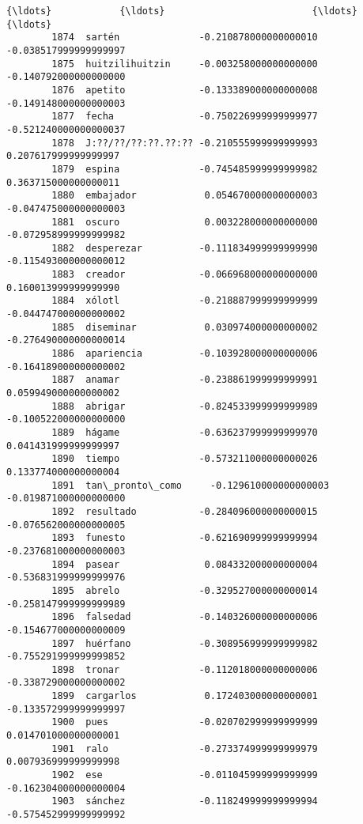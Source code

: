 \documentclass[11pt]{article}
\begin{document}
\begin{Verbatim}[commandchars=\\\{\}]
        {\ldots}            {\ldots}                          {\ldots}                   {\ldots}   
        1874  sartén              -0.210878000000000010 -0.038517999999999997   
        1875  huitzilihuitzin     -0.003258000000000000 -0.140792000000000000   
        1876  apetito             -0.133389000000000008 -0.149148000000000003   
        1877  fecha               -0.750226999999999977 -0.521240000000000037   
        1878  J:??/??/??:??.??:?? -0.210555999999999993  0.207617999999999997   
        1879  espina              -0.745485999999999982  0.363715000000000011   
        1880  embajador            0.054670000000000003 -0.047475000000000003   
        1881  oscuro               0.003228000000000000 -0.072958999999999982   
        1882  desperezar          -0.111834999999999990 -0.115493000000000012   
        1883  creador             -0.066968000000000000  0.160013999999999990   
        1884  xólotl              -0.218887999999999999 -0.044747000000000002   
        1885  diseminar            0.030974000000000002 -0.276490000000000014   
        1886  apariencia          -0.103928000000000006 -0.164189000000000002   
        1887  anamar              -0.238861999999999991  0.059949000000000002   
        1888  abrigar             -0.824533999999999989 -0.100522000000000000   
        1889  hágame              -0.636237999999999970  0.041431999999999997   
        1890  tiempo              -0.573211000000000026  0.133774000000000004   
        1891  tan\_pronto\_como     -0.129610000000000003 -0.019871000000000000   
        1892  resultado           -0.284096000000000015 -0.076562000000000005   
        1893  funesto             -0.621690999999999994 -0.237681000000000003   
        1894  pasear               0.084332000000000004 -0.536831999999999976   
        1895  abrelo              -0.329527000000000014 -0.258147999999999989   
        1896  falsedad            -0.140326000000000006 -0.154677000000000009   
        1897  huérfano            -0.308956999999999982 -0.755291999999999852   
        1898  tronar              -0.112018000000000006 -0.338729000000000002   
        1899  cargarlos            0.172403000000000001 -0.133572999999999997   
        1900  pues                -0.020702999999999999  0.014701000000000001   
        1901  ralo                -0.273374999999999979  0.007936999999999998   
        1902  ese                 -0.011045999999999999 -0.162304000000000004   
        1903  sánchez             -0.118249999999999994 -0.575452999999999992   
        

\end{Verbatim}
\end{document}
